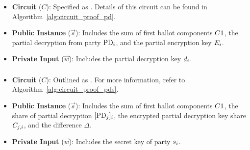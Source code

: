 \documentclass[runningheads]{llncs}
\begin{document}
\begin{itemize}
    \item \textbf{Circuit} ($C$): Specified as \ProofPDInformal{}. Details of this circuit can be found in Algorithm~\ref{alg:circuit_proof_pd}.
    \item \textbf{Public Instance} ($\vec{s}$): Includes the sum of first ballot components $C1{}$, the partial decryption from party $\mathrm{PD}_{i}$, and the partial encryption key $E_{i}$.
    \item \textbf{Private Input} ($\vec{w}$): Includes the partial decryption key $d_{i}$.
\end{itemize}

\subsubsection{}\label{sec:proof-pds}

\begin{itemize}
    \item \textbf{Circuit} ($C$): Outlined as \ProofPDSInformal{}. For more information, refer to Algorithm~\ref{alg:circuit_proof_pds}.
    \item \textbf{Public Instance} ($\vec{s}$): Includes the sum of first ballot components $C1{}$, the share of partial decryption $[\mathrm{PD}_{j}]_{i}$, the encrypted partial decryption key share $C_{j,i}$, and the difference $\Delta$.
    \item \textbf{Private Input} ($\vec{w}$): Includes the secret key of party $s_{i}$.
\end{itemize}
\end{document}
